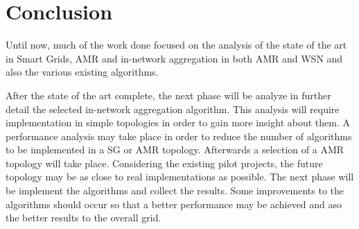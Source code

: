 \chapter{Conclusion}\label{c:conc}
Until now, much of the work done focused on the analysis of the state of the art in Smart Grids, AMR and in-network aggregation in both AMR and WSN and also the various existing algorithms.

After the state of the art complete, the next phase will be analyze in further detail the selected in-network aggregation algorithm. This analysis will require implementation in simple topologies in order to gain more insight about them. A performance analysis may take place in order to reduce the number of algorithms to be implemented in a SG or AMR topology. Afterwards a selection of a AMR topology will take place. Considering the existing pilot projects, the future topology may be as close to real implementations as possible. The next phase will be implement the algorithms and collect the results. Some improvements to the algorithms should occur so that a better performance may be achieved and aso the better results to the overall grid. 


